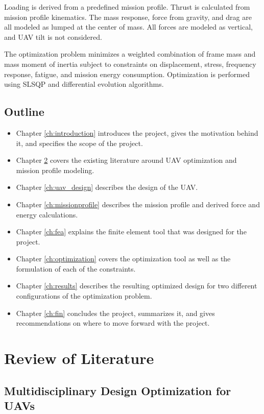 \documentclass[doublespace,nopageskip]{VTthesis}
\begin{document}
			Loading is derived from a predefined mission profile. Thrust is calculated from mission profile kinematics. The mass response, force from gravity, and drag are all modeled as lumped at the center of mass. All forces are modeled as vertical, and UAV tilt is not considered. 
			
			The optimization problem minimizes a weighted combination of frame mass and mass moment of inertia subject to constraints on displacement, stress, frequency response, fatigue, and mission energy consumption. Optimization is performed using SLSQP and differential evolution algorithms.
			
		\section{Outline} 
			\begin{itemize}
				\item Chapter \ref{ch:introduction} introduces the project, gives the motivation behind it, and specifies the scope of the project.
				\item Chapter \ref{ch:lit_review} covers the existing literature around UAV optimization and mission profile modeling.
				\item Chapter \ref{ch:uav_design} describes the design of the UAV.
				\item Chapter \ref{ch:missionprofile} describes the mission profile and derived force and energy calculations.
				\item Chapter \ref{ch:fea} explains the finite element tool that was designed for the project.
				\item Chapter \ref{ch:optimization} covers the optimization tool as well as the formulation of each of the constraints. 
				\item Chapter \ref{ch:results} describes the resulting optimized design for two different configurations of the optimization problem. 
				\item Chapter \ref{ch:fin} concludes the project, summarizes it, and gives recommendations on where to move forward with the project. 
			\end{itemize}
			
	\chapter{Review of Literature} \label{ch:lit_review}
		\section{Multidisciplinary Design Optimization for UAVs}
						
\end{document}
